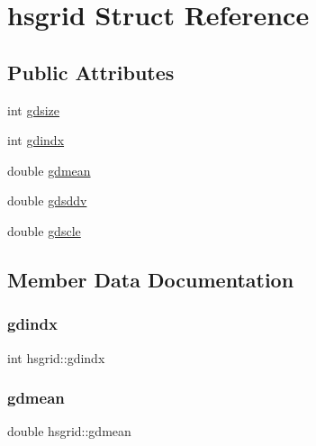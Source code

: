 \hypertarget{structhsgrid}{}\section{hsgrid Struct Reference}
\label{structhsgrid}
\subsection*{Public Attributes}
\begin{DoxyCompactItemize}
\item 
int \hyperlink{structhsgrid_a4b5c589981c90e31408c873854b73746}{gdsize}
\item 
int \hyperlink{structhsgrid_a2c42f9344b8b5d16ce1359ac92e09f3c}{gdindx}
\item 
double \hyperlink{structhsgrid_a5f876510b0ffd7f7b1e61b3b62f29538}{gdmean}
\item 
double \hyperlink{structhsgrid_abf3eb94d02a77782b99c47c7df417f3e}{gdsddv}
\item 
double \hyperlink{structhsgrid_a6851632697502a1b63cf1645d0c4ad97}{gdscle}
\end{DoxyCompactItemize}


\subsection{Member Data Documentation}
\mbox{\label{structhsgrid_a2c42f9344b8b5d16ce1359ac92e09f3c}} 
\subsubsection{\texorpdfstring{gdindx}{gdindx}}
{\footnotesize\ttfamily int hsgrid\+::gdindx}

\mbox{\label{structhsgrid_a5f876510b0ffd7f7b1e61b3b62f29538}} 
\subsubsection{\texorpdfstring{gdmean}{gdmean}}
{\footnotesize\ttfamily double hsgrid\+::gdmean}

\mbox{\label{structhsgrid_a6851632697502a1b63cf1645d0c4ad97}} 
